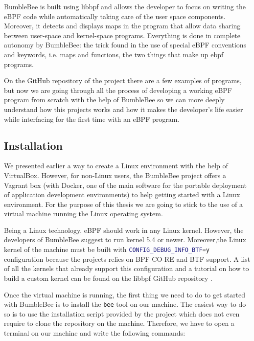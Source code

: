 BumbleBee is built using libbpf and allows the developer to focus on writing the eBPF code while automatically taking care of the user space components. 
Moreover, it detects and displays maps in the program that allow data sharing between user-space and kernel-space programs. 
Everything is done in complete autonomy by BumbleBee: the trick found in the use of special eBPF conventions and keywords, i.e. maps and functions, the two things that make up ebpf programs.

On the GitHub repository of the project there are a few examples of programs, but now we are going through all the process of developing a working eBPF program from scratch with the help of BumbleBee so we can more deeply understand how this projects works and how it makes the developer's life easier while interfacing for the first time with an eBPF program.

\subsection{Installation}

We presented earlier a way to create a Linux environment with the help of VirtualBox.
However, for non-Linux users, the BumbleBee project offers a Vagrant box \cite{BumblebeeVagrant} (with Docker, one of the main software for the portable deployment of application development environments) to help getting started with a Linux environment.
For the purpose of this thesis we are going to stick to the use of a virtual machine running the Linux operating system.

Being a Linux technology, eBPF should work in any Linux kernel.
However, the developers of BumbleBee suggest to run kernel 5.4 or newer.
Moreover,the Linux kernel of the machine must be built with \colorbox{backcolour}{\lstinline[style=highlight, language=bash]|CONFIG_DEBUG_INFO_BTF=y|} configuration because the projects relies on BPF CO-RE and BTF support.
A list of all the kernels that already support this configuration and a tutorial on how to build a custom kernel can be found on the libbpf GitHub repository \cite{BTFKernelConfig}.

Once the virtual machine is running, the first thing we need to do to get started with BumbleBee is to install the \colorbox{backcolour}{\lstinline[style=highlight, language=bash]|bee|} tool on our machine.
The easiest way to do so is to use the installation script provided by the project which does not even require to clone the repository on the machine.
Therefore, we have to open a terminal on our machine and write the following commands:

